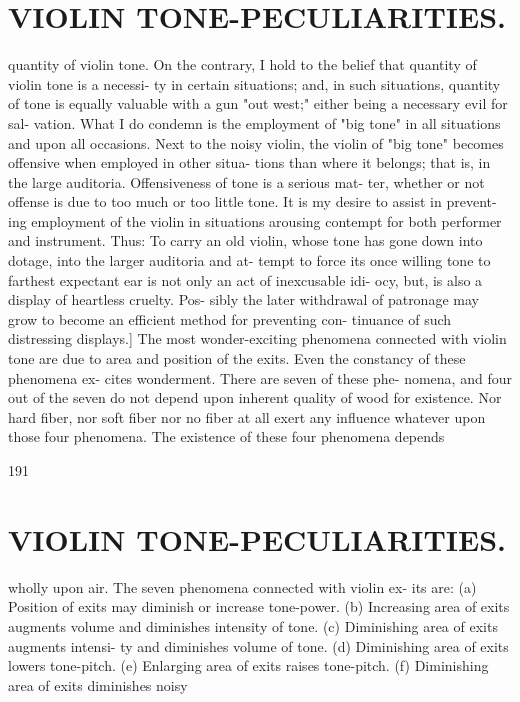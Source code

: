\documentclass{article}
\begin{document}
\section*{VIOLIN TONE-PECULIARITIES.}
quantity of violin tone. On the contrary, I hold to the belief that quantity of violin tone is a necessi- ty in certain situations; and, in such situations, quantity of tone is equally valuable with a gun "out west;" either being a necessary evil for sal- vation. What I do condemn is the employment of "big tone" in all situations and upon all occasions. Next to the noisy violin, the violin of "big tone" becomes offensive when employed in other situa- tions than where it belongs; that is, in the large auditoria. Offensiveness of tone is a serious mat- ter, whether or not offense is due to too much or too little tone. It is my desire to assist in prevent- ing employment of the violin in situations arousing contempt for both performer and instrument. Thus: To carry an old violin, whose tone has gone down into dotage, into the larger auditoria and at- tempt to force its once willing tone to farthest expectant ear is not only an act of inexcusable idi- ocy, but, is also a display of heartless cruelty. Pos- sibly the later withdrawal of patronage may grow to become an efficient method for preventing con- tinuance of such distressing displays.] The most wonder-exciting phenomena connected with violin tone are due to area and position of the exits. Even the constancy of these phenomena ex- cites wonderment. There are seven of these phe- nomena, and four out of the seven do not depend upon inherent quality of wood for existence. Nor hard fiber, nor soft fiber nor no fiber at all exert any influence whatever upon those four phenomena. The existence of these four phenomena depends

191

\section*{VIOLIN TONE-PECULIARITIES.}
wholly upon air. The seven phenomena connected with violin ex- its are: (a) Position of exits may diminish or increase tone-power. (b) Increasing area of exits augments volume and diminishes intensity of tone. (c) Diminishing area of exits augments intensi- ty and diminishes volume of tone. (d) Diminishing area of exits lowers tone-pitch. (e) Enlarging area of exits raises tone-pitch. (f) Diminishing area of exits diminishes noisy
\end{document}
